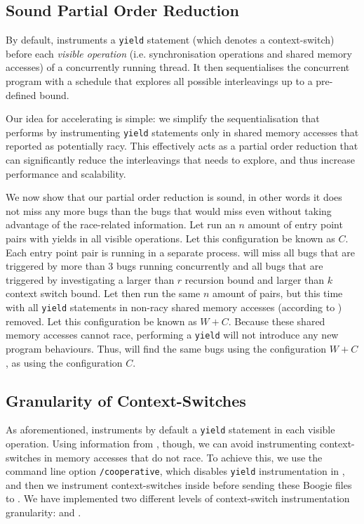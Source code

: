 \subsection{Sound Partial Order Reduction}
\label{bf:reduction}

By default, \corral instruments a \texttt{yield} statement (which denotes a
context-switch) before each \emph{visible operation} (i.e. synchronisation
operations and shared memory accesses) of a concurrently running thread. It then
sequentialises the concurrent program with a schedule that explores all possible
interleavings up to a pre-defined bound.

Our idea for accelerating \corral is simple: we simplify the sequentialisation that \corral performs by instrumenting \texttt{yield} statements only in shared memory accesses that \whoop reported as potentially racy. This effectively acts as a partial order reduction that can significantly reduce the interleavings that \corral needs to explore, and thus increase performance and scalability.

We now show that our partial order reduction is sound, in other words it does not miss any more bugs than the bugs that \corral would miss even without taking advantage of the \whoop race-related information. Let \corral run an $n$ amount of entry point pairs with yields in all visible operations. Let this configuration be known as $C$. Each entry point pair is running in a separate \corral process. \corral will miss all bugs that are triggered by more than 3 bugs running concurrently and all bugs that are triggered by investigating a larger than $r$ recursion bound and larger than $k$ context switch bound. Let \corral then run the same $n$ amount of pairs, but this time with all \texttt{yield} statements in non-racy shared memory accesses (according to \whoop) removed. Let this configuration be known as $W+C$. Because these shared memory accesses cannot race, performing a \texttt{yield} will not introduce any new program behaviours. Thus, \corral will find the same bugs using the configuration $W+C$, as using the configuration $C$.

\subsection{Granularity of Context-Switches}
\label{bf:granularity}

As aforementioned, \corral instruments by default a \texttt{yield} statement in each visible operation. Using information from \whoop, though, we can avoid instrumenting context-switches in memory accesses that do not race. To achieve this, we use the \corral command line option \texttt{/cooperative}, which disables \texttt{yield} instrumentation in \corral, and then we instrument context-switches inside \whoop before sending these Boogie files to \corral. We have implemented two different levels of context-switch instrumentation granularity: \emph{\yieldcoarse} and \emph{\yieldmr}.

